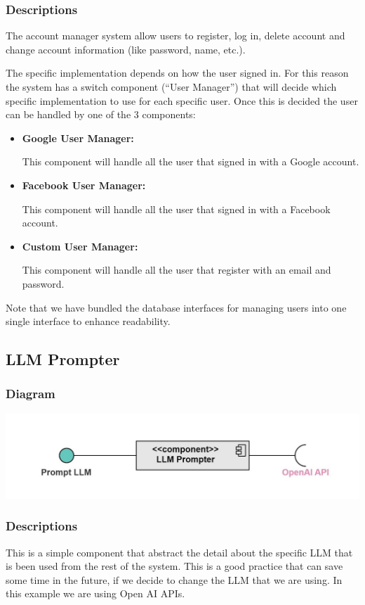 \documentclass{article}
\begin{document}
\subsubsection{Descriptions}
The account manager system allow users to register, log in, delete account and change account information (like password, name, etc.).

The specific implementation depends on how the user signed in. For this reason the system has a switch component (``User Manager'')
that will decide which specific implementation to use for each specific user. Once this is decided the user
can be handled by one of the 3 components:
\begin{itemize}
    \item \textbf{Google User Manager: }

          This component will handle all the user that signed in with a Google account.
    \item \textbf{Facebook User Manager: }

          This component will handle all the user that signed in with a Facebook account.
    \item \textbf{Custom User Manager: }

          This component will handle all the user that register with an email and password.
\end{itemize}
Note that we have bundled the database interfaces for managing users into one single interface to enhance readability.
\subsection{LLM Prompter}
\subsubsection{Diagram}
\includegraphics[width=\textwidth,height=\textheight,keepaspectratio]{images/component_diagram/llm_prompter.jpg}
\subsubsection{Descriptions}
This is a simple component that abstract the detail about the specific LLM that is been used from the rest of the system.
This is a good practice that can save some time in the future, if we decide to change the LLM that we are using.
In this example we are using Open AI APIs.
\end{document}
